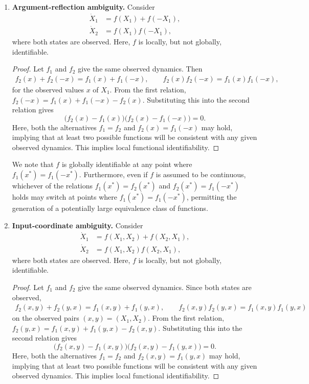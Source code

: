 \documentclass{article}
\theoremstyle{plain}
\theoremstyle{definition}
\begin{document}
{\begin{enumerate}
    \item \textbf{Argument-reflection ambiguity.} Consider
    \begin{align*}
        \dot{X}_1 &= f(X_1)+f(-X_1),\\
        \dot{X}_2 &= f(X_1)f(-X_1),
    \end{align*}
    where both states are observed. Here, $f$ is locally, but not globally, identifiable.
    \begin{proof}[Proof]
        Let $f_1$ and $f_2$ give the same observed dynamics. Then
        \begin{align*}
            f_2(x)+f_2(-x)=f_1(x)+f_1(-x),
            \qquad
            f_2(x)f_2(-x)=f_1(x)f_1(-x),
        \end{align*}
        for the observed values $x$ of $X_1$. From the first relation, $f_2(-x)=f_1(x)+f_1(-x)-f_2(x)$. Substituting this into the second relation gives
        \begin{equation*}
            \bigl(f_2(x)-f_1(x)\bigr)\bigl(f_2(x)-f_1(-x)\bigr)=0.
        \end{equation*}
        Here, both the alternatives $f_1=f_2$ and $f_2(x)=f_1(-x)$ may hold, implying that at least two possible functions will be consistent with any given observed dynamics. This implies local functional identifiability.
    \end{proof}

    We note that $f$ is globally identifiable at any point where $f_1(x^*)=f_1(-x^*)$. Furthermore, even if $f$ is assumed to be continuous, whichever of the relations $f_1(x^*)=f_2(x^*)$ and $f_2(x^*)=f_1(-x^*)$ holds may switch at points where $f_1(x^*)=f_1(-x^*)$, permitting the generation of a potentially large equivalence class of functions.

    \item \textbf{Input-coordinate ambiguity.} Consider
    \begin{align*}
        \dot{X}_1 &= f(X_1,X_2)+f(X_2,X_1),\\
        \dot{X}_2 &= f(X_1,X_2)f(X_2,X_1),
    \end{align*}
    where both states are observed. Here, $f$ is locally, but not globally, identifiable.
    \begin{proof}[Proof]
        Let $f_1$ and $f_2$ give the same observed dynamics. Since both states are observed,
        \begin{align*}
            f_2(x,y)+f_2(y,x)=f_1(x,y)+f_1(y,x),
            \qquad
            f_2(x,y)f_2(y,x)=f_1(x,y)f_1(y,x)
        \end{align*}
        on the observed pairs $(x,y)=(X_1,X_2)$. From the first relation, $f_2(y,x)=f_1(x,y)+f_1(y,x)-f_2(x,y)$. Substituting this into the second relation gives
        \begin{equation*}
            \bigl(f_2(x,y)-f_1(x,y)\bigr)\bigl(f_2(x,y)-f_1(y,x)\bigr)=0.
        \end{equation*}
        Here, both the alternatives $f_1=f_2$ and $f_2(x,y)=f_1(y,x)$ may hold, implying that at least two possible functions will be consistent with any given observed dynamics. This implies local functional identifiability.
    \end{proof}


\end{enumerate}}
\end{document}
